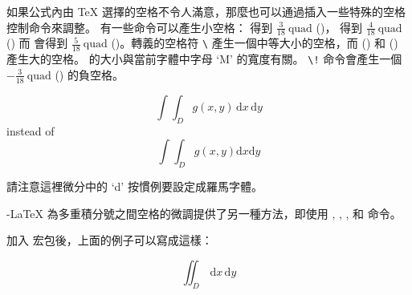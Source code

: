 
如果公式內由 \TeX{} 選擇的空格不令人滿意，那麼也可以通過插入一些特殊的空格控制命令來調整。
有一些命令可以產生小空格：\ci{,} 得到 $\frac{3}{18}\:\textrm{quad}$
(\demowidth{0.166em})，\ci{:} 得到 $\frac{4}{18}\: \textrm{quad}$
(\demowidth{0.222em}) 而 \ci{;} 會得到 $\frac{5}{18}\:
\textrm{quad}$
(\demowidth{0.277em})。轉義的空格符 \verb*.\. 產生一個中等大小的空格，而 
(\demowidth{1em}) 和 
(\demowidth{2em}) 產生大的空格。 的大小與當前字體中字母 `M' 的寬度有關。
 \verb|\!| 命令會產生一個 $-\frac{3}{18}\:\textrm{quad}$
(\demowidth{0.166em}) 的負空格。
\begin{example}
\newcommand{\ud}{\mathrm{d}}
\begin{displaymath}
\int\!\!\!\int_{D} g(x,y)
  \, \ud x\, \ud y
\end{displaymath}
instead of
\begin{displaymath}
\int\int_{D} g(x,y)\ud x \ud y
\end{displaymath}
\end{example}
%

請注意這裡微分中的 `d' 按慣例要設定成羅馬字體。

\AmS-\LaTeX{} 為多重積分號之間空格的微調提供了另一種方法，即使用 , , , 和  命令。

加入  宏包後，上面的例子可以寫成這樣：

\begin{example}
\newcommand{\ud}{\mathrm{d}}
\begin{displaymath}
\iint_{D} \, \ud x \, \ud y
\end{displaymath}
\end{example}

